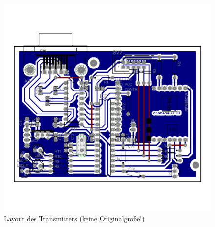 \documentclass[pdftex, parskip, numbers=noenddot, toc=listof]{scrbook}
\begin{document}
	\begin{figure}
		\centering
		\includegraphics[width=.95\textwidth, keepaspectratio]{Bilder/Transmitterlayout}
		\caption{Layout des Transmitters (keine Originalgröße!)}
		\label{fig:transmitterlayout}
	\end{figure}
\end{document}
